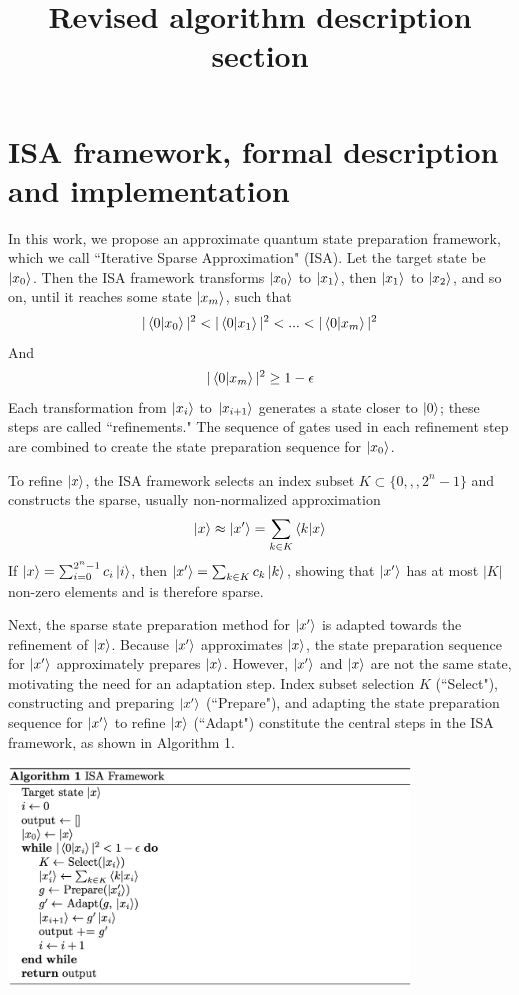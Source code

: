 \documentclass{article}
\begin{document}
\title{Revised algorithm description section}
\maketitle

\section{ISA framework, formal description and implementation}
In this work, we propose an approximate quantum state preparation framework,
which we call ``Iterative Sparse Approximation" (ISA). Let the target state be
$\mathinner{|{x_0}\rangle}$. Then the ISA framework transforms $\mathinner{|{x_0}\rangle}$ to 
$\mathinner{|{x_1}\rangle}$, then $\mathinner{|{x_1}\rangle}$ to $\mathinner{|{x_2}\rangle}$, and so on, until it reaches some
state $\mathinner{|{x_m}\rangle}$, such that
$$|\mathinner{\langle{0|x_0}\rangle}|^2 < |\mathinner{\langle{0|x_1}\rangle}|^2 < ... < |\mathinner{\langle{0|x_m}\rangle}|^2$$
And
$$|\mathinner{\langle{0|x_m}\rangle}|^2 \geq 1 - \epsilon$$
Each transformation from $\mathinner{|{x_i}\rangle}$ to $\mathinner{|{x_{i + 1}}\rangle}$ generates a state
closer to $\mathinner{|{0}\rangle}$; these steps are called ``refinements." The sequence 
of gates used in each refinement step are combined to create the 
state preparation sequence for $\mathinner{|{x_0}\rangle}$.

To refine $\mathinner{|{x}\rangle}$, the
ISA framework selects an index subset $K \subset \{0,,,2^n - 1\}$ 
and constructs the sparse, usually non-normalized approximation
$$\mathinner{|{x}\rangle} \approx \mathinner{|{x'}\rangle} = \sum_{k \in K}{\mathinner{\langle{k | x}\rangle}}$$
If $\mathinner{|{x}\rangle} = \sum_{i=0}^{2^n - 1}{c_i \mathinner{|{i}\rangle}}$, then 
$\mathinner{|{x'}\rangle} = \sum_{k \in K}{c_k\mathinner{|{k}\rangle}}$, showing that $\mathinner{|{x'}\rangle}$ has at
most $|K|$ non-zero elements and is therefore sparse.

Next, the sparse state preparation method for $\mathinner{|{x'}\rangle}$
is adapted towards the refinement of $\mathinner{|{x}\rangle}$. Because $\mathinner{|{x'}\rangle}$
approximates $\mathinner{|{x}\rangle}$, the state preparation sequence for 
$\mathinner{|{x'}\rangle}$ approximately prepares $\mathinner{|{x}\rangle}$. However, $\mathinner{|{x'}\rangle}$ and 
$\mathinner{|{x}\rangle}$ are not the same state, motivating the need for an adaptation step.
Index subset selection $K$ (``Select"), constructing and preparing $\mathinner{|{x'}\rangle}$ 
(``Prepare"), and adapting the state preparation sequence for $\mathinner{|{x'}\rangle}$ to 
refine $\mathinner{|{x}\rangle}$ (``Adapt") constitute the central steps in the ISA framework,
as shown in Algorithm 1.

\includegraphics[width=0.8\textwidth]{isa_algo}
\end{document}
